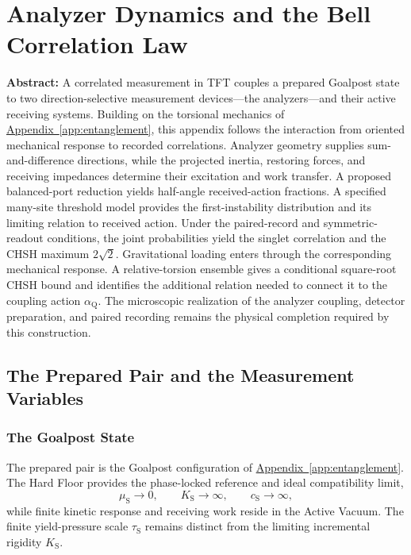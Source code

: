 \chapter{Analyzer Dynamics and the Bell Correlation Law}
\label{app:quantum_entanglement}

\noindent\textbf{Abstract:}
A correlated measurement in TFT couples a prepared Goalpost state to two direction-selective measurement devices---the analyzers---and their active receiving systems. Building on the torsional mechanics of \hyperref[app:entanglement]{Appendix~\ref*{app:entanglement}}, this appendix follows the interaction from oriented mechanical response to recorded correlations. Analyzer geometry supplies sum-and-difference directions, while the projected inertia, restoring forces, and receiving impedances determine their excitation and work transfer. A proposed balanced-port reduction yields half-angle received-action fractions. A specified many-site threshold model provides the first-instability distribution and its limiting relation to received action. Under the paired-record and symmetric-readout conditions, the joint probabilities yield the singlet correlation and the CHSH maximum $2\sqrt{2}$. Gravitational loading enters through the corresponding mechanical response. A relative-torsion ensemble gives a conditional square-root CHSH bound and identifies the additional relation needed to connect it to the coupling action $\alpha_{\mathrm Q}$. The microscopic realization of the analyzer coupling, detector preparation, and paired recording remains the physical completion required by this construction.

\section{The Prepared Pair and the Measurement Variables}
\label{sec:entanglement_scope}

\subsection{The Goalpost State}
\label{sec:entanglement_goalpost}

The prepared pair is the Goalpost configuration of \hyperref[app:entanglement]{Appendix~\ref*{app:entanglement}}. The Hard Floor provides the phase-locked reference and ideal compatibility limit,
\begin{equation}
    \mu_{\mathrm S}\rightarrow0,
    \qquad K_{\mathrm S}\rightarrow\infty,
    \qquad c_{\mathrm S}\rightarrow\infty,
    \label{eq:entanglement_hardfloor_limit}
\end{equation}
while finite kinetic response and receiving work reside in the Active Vacuum. The finite yield-pressure scale $\tau_{\mathrm S}$ remains distinct from the limiting incremental rigidity $K_{\mathrm S}$.

